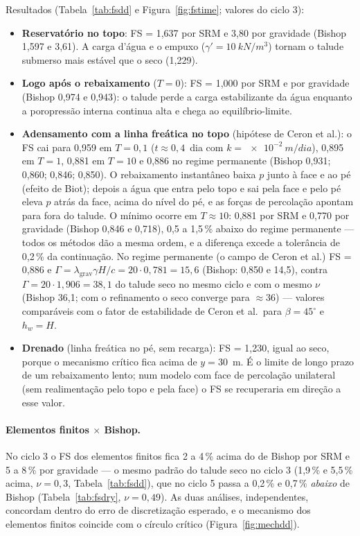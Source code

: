 \documentclass[11pt,a4paper]{article}
\begin{document}
Resultados (Tabela~\ref{tab:fsdd} e Figura~\ref{fig:fstime}; valores do ciclo 3):
\begin{itemize}
\item \textbf{Reservatório no topo}: FS = 1,637 por SRM e 3,80 por gravidade (Bishop 1,597 e 3,61). A
  carga d'água e o empuxo ($\gamma'=\SI{10}{kN/m^3}$) tornam o talude submerso mais estável que o
  seco (1,229).
\item \textbf{Logo após o rebaixamento} ($T=0$): FS = 1,000 por SRM e por gravidade (Bishop 0,974 e
  0,943): o talude perde a carga estabilizante da água enquanto a poropressão interna continua alta e
  chega ao equilíbrio-limite.
\item \textbf{Adensamento com a linha freática no topo} (hipótese de Ceron et al.): o FS cai para 0,959
  em $T=0{,}1$ ($t\approx0{,}4$~dia com $k=\SI{e-2}{m/dia}$), 0,895 em $T=1$, 0,881 em $T=10$ e 0,886 no
  regime permanente (Bishop 0,931; 0,860; 0,846; 0,850). O rebaixamento instantâneo baixa $p$ junto à
  face e ao pé (efeito de Biot); depois a água que entra pelo topo e sai pela face e pelo pé eleva
  $p$ atrás da face, acima do nível do pé, e as forças de percolação apontam para fora do talude. O
  mínimo ocorre em $T\approx10$: 0,881 por SRM e 0,770 por gravidade (Bishop 0,846 e 0,718), 0,5 a
  1,5\,\% abaixo do regime permanente --- todos os métodos dão a mesma ordem, e a diferença excede a
  tolerância de 0,2\,\% da continuação. No regime permanente (o campo de Ceron et al.) FS = 0,886 e
  $\Gamma=\lambda_{\text{grav}}\gamma H/c=20\cdot0{,}781=15{,}6$ (Bishop: 0,850 e 14,5), contra
  $\Gamma=20\cdot1{,}906=38{,}1$ do talude seco no mesmo ciclo e com o mesmo $\nu$ (Bishop 36,1; com o
  refinamento o seco converge para $\approx36$) --- valores comparáveis com o fator de estabilidade de
  Ceron et al.\ para $\beta=45^\circ$ e $h_w=H$.
\item \textbf{Drenado} (linha freática no pé, sem recarga): FS = 1,230, igual ao seco, porque o mecanismo
  crítico fica acima de $y=30$~m. É o limite de longo prazo de um rebaixamento lento; num modelo com face
  de percolação unilateral (sem realimentação pelo topo e pela face) o FS se recuperaria em direção a
  esse valor.
\end{itemize}

\paragraph{Elementos finitos $\times$ Bishop.} No ciclo 3 o FS dos elementos finitos fica 2 a 4\,\% acima
do de Bishop por SRM e 5 a 8\,\% por gravidade --- o mesmo padrão do talude seco no ciclo 3 (1,9\,\% e
5,5\,\% acima, $\nu=0{,}3$, Tabela~\ref{tab:fsdd}), que no ciclo 5 passa a 0,2\,\% e 0,7\,\% \emph{abaixo}
de Bishop (Tabela~\ref{tab:fsdry}, $\nu=0{,}49$). As duas análises,
independentes, concordam dentro do erro de discretização esperado, e o mecanismo dos elementos finitos
coincide com o círculo crítico (Figura~\ref{fig:mechdd}).
\end{document}
